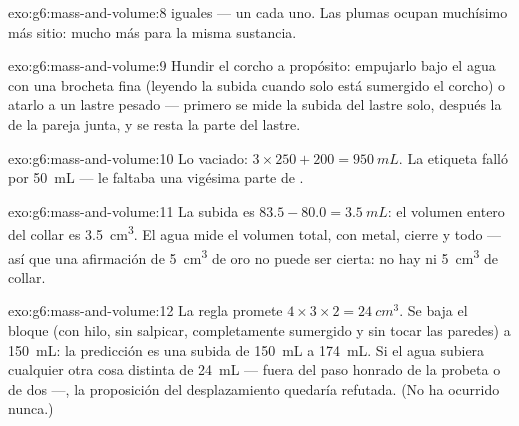 \begin{solution}{exo:g6:mass-and-volume:8}
 iguales --- un  cada uno. Las plumas ocupan muchísimo
más sitio: mucho más  para la misma sustancia.
\end{solution}

\begin{solution}{exo:g6:mass-and-volume:9}
Hundir el corcho a propósito: empujarlo bajo el agua con una brocheta
fina (leyendo la subida cuando solo está sumergido el corcho) o atarlo
a un lastre pesado --- primero se mide la subida del lastre solo,
después la de la pareja junta, y se resta la parte del lastre.
\end{solution}

\begin{solution}{exo:g6:mass-and-volume:10}
Lo vaciado: $3 \times 250 + 200 = \qty{950}{mL}$. La etiqueta falló
por \qty{50}{mL} --- le faltaba una vigésima parte de .
\end{solution}

\begin{solution}{exo:g6:mass-and-volume:11}
La subida es $83.5 - 80.0 = \qty{3.5}{mL}$: el volumen entero del
collar es \qty{3.5}{cm^3}. El agua mide el volumen total, con
metal, cierre y todo --- así que una afirmación de \qty{5}{cm^3} de
oro no puede ser cierta: no hay ni \qty{5}{cm^3} de collar.
\end{solution}

\begin{solution}{exo:g6:mass-and-volume:12}
La regla promete $4 \times 3 \times 2 = \qty{24}{cm^3}$. Se baja el
bloque (con hilo, sin salpicar, completamente sumergido y sin tocar
las paredes) a \qty{150}{mL}: la predicción es una subida de
\qty{150}{mL} a \qty{174}{mL}. Si el agua subiera cualquier otra cosa
distinta de \qty{24}{mL} --- fuera del paso honrado de la probeta o de
dos ---, la proposición del desplazamiento quedaría refutada. (No ha
ocurrido nunca.)
\end{solution}

